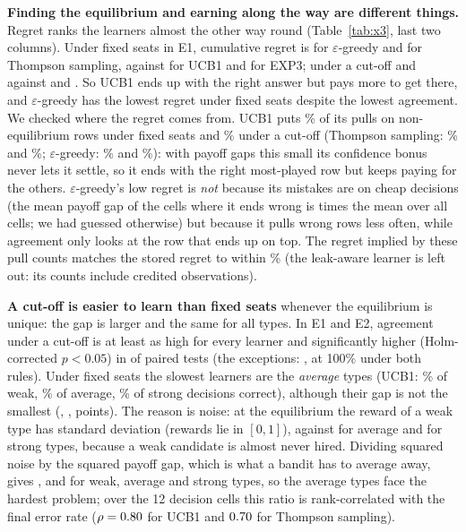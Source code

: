 \documentclass[10pt]{article}
\theoremstyle{plain}
\theoremstyle{definition}\newtheorem{definition}{Definition}
\newcommand{\finding}[1]{\textbf{#1}}
\begin{document}
\finding{Finding the equilibrium and earning along the way are different things.} Regret ranks the learners almost the other way round (Table~\ref{tab:x3}, last
two columns). Under fixed seats in E1, cumulative regret is \RegretEpsEoneSeats{} for $\varepsilon$-greedy and \RegretTsEoneSeats{} for Thompson sampling, against
\RegretUcbEoneSeats{} for UCB1 and \RegretExpEoneSeats{} for EXP3; under a cut-off \RegretEpsEoneBar{} and \RegretTsEoneBar{} against \RegretUcbEoneBar{} and
\RegretExpEoneBar. So UCB1 ends up with the right answer but pays more to get there, and $\varepsilon$-greedy has the lowest regret under fixed seats
despite the lowest agreement. We checked where the regret comes from. UCB1 puts \ExpWrongUcbSeats\% of its pulls on non-equilibrium rows under fixed seats and \ExpWrongUcbBar\% under a cut-off
(Thompson sampling: \ExpWrongTsSeats\% and \ExpWrongTsBar\%; $\varepsilon$-greedy: \ExpWrongEpsSeats\% and \ExpWrongEpsBar\%): with payoff gaps this small its confidence bonus never lets it settle, so it ends with the right most-played row but keeps paying for the others.
$\varepsilon$-greedy's low regret is \emph{not} because its mistakes are on cheap decisions (the mean payoff gap of the cells where it ends wrong is \ExpMistakeGapEpsSeats{} times the mean over all cells; we had guessed otherwise) but because it pulls wrong rows less often,
while agreement only looks at the row that ends up on top. The regret implied by these pull counts matches the stored regret to within \ExpCostMatchPct\% (the leak-aware learner is left out: its counts include credited observations).

\finding{A cut-off is easier to learn than fixed seats} whenever the equilibrium is unique: the gap is larger and the same for all types. In E1 and E2, agreement under a cut-off is at least as high for every learner and significantly higher
(Holm-corrected $p<0.05$) in \BarSeatsSig{} of \BarSeatsTests{} paired tests (the exceptions: \BarSeatsNotSigLearners, at 100\% under both rules). Under fixed seats the slowest learners are the \emph{average} types (UCB1: \TypeUcbEoneSeatsWeak\% of weak, \TypeUcbEoneSeatsAvg\% of average,
\TypeUcbEoneSeatsStrong\% of strong decisions correct), although their gap is not the smallest (\PayGapTypeEoneSeatsWeak, \PayGapTypeEoneSeatsAvg, \PayGapTypeEoneSeatsStrong{} points). The reason is noise: at the equilibrium the reward of a weak type has standard deviation \ExpSdWeak{} (rewards lie in $[0,1]$), against \ExpSdAvg{} for average and \ExpSdStrong{} for strong types, because a weak candidate is almost never hired.
Dividing squared noise by the squared payoff gap, which is what a bandit has to average away, gives \ExpSnrWeak, \ExpSnrAvg{} and \ExpSnrStrong{} for weak, average and strong types, so the average types face the hardest problem; over the 12 decision cells this ratio
is rank-correlated with the final error rate ($\rho=0.80$ for UCB1 and $0.70$ for Thompson sampling).
\end{document}
